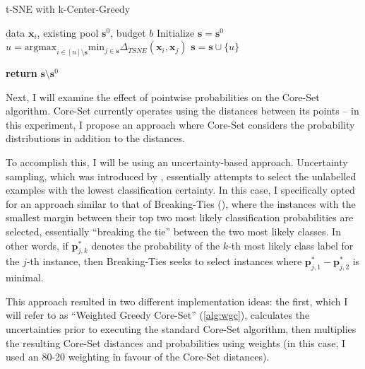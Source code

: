 \documentclass[english,bachelor,ul]{webisthesis} %
\begin{document}
\begin{algorithm}
\caption{t-SNE with k-Center-Greedy}%
\makeatletter{}\makeatother
\label{alg:coreset-tsne}
\begin{algorithmic}


\Require data $ \mathbf{x}_i $, existing pool $ \mathbf{s}^0 $, budget $ b $
\State Initialize $ \mathbf{s} = \mathbf{s}^0 $
\Repeat
\State $ u = \text{argmax}_{i \in [n] \setminus \mathbf{s}} \text{min}_{j \in \mathbf{s}} \Delta_{TSNE}(\mathbf{x}_i, \mathbf{x}_j) $
\State $ \mathbf{s} = \mathbf{s} \cup \{u\} $

\State \textbf{return} $\mathbf{s} \setminus \mathbf{s}^0 $
\end{algorithmic}
\end{algorithm}

Next, I will examine the effect of pointwise probabilities on the Core-Set algorithm. Core-Set currently operates using the distances between its points -- in this experiment, I propose an approach where Core-Set considers the probability distributions in addition to the distances. 

To accomplish this, I will be using an uncertainty-based approach. Uncertainty sampling, which was introduced by \cite{DBLP:conf/sigir/LewisG94}, essentially attempts to select the unlabelled examples with the lowest classification certainty. In this case, I specifically opted for an approach similar to that of Breaking-Ties (\cite{DBLP:journals/jmlr/LuoKGHSRH05}), where the instances with the smallest margin between their top two most likely classification probabilities are selected, essentially ``breaking the tie'' between the two most likely classes. In other words, if $ \mathbf{p}_{j, k}^* $ denotes the probability of the $ k $-th most likely class label for the $ j $-th instance, then Breaking-Ties seeks to select instances where $ \mathbf{p}_{j, 1}^* - \mathbf{p}_{j, 2}^* $ is minimal.

This approach resulted in two different implementation ideas: the first, which I will refer to as ``Weighted Greedy Core-Set'' (\ref{alg:wgc}), calculates the uncertainties prior to executing the standard Core-Set algorithm, then multiplies the resulting Core-Set distances and probabilities using weights (in this case, I used an 80-20 weighting in favour of the Core-Set distances). 
\end{document}
